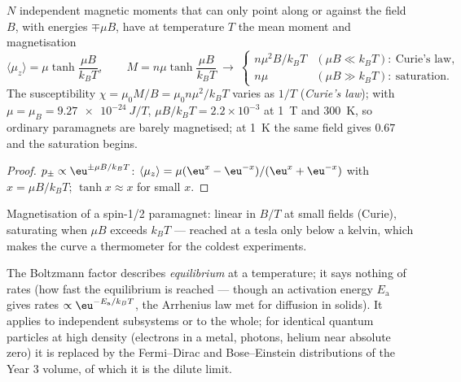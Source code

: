 \begin{proposition}\label{prop:b2:boltzmann-factor:curie}
$N$ independent magnetic moments that can only point along or against
the field $B$, with energies $\mp\mu B$, have at temperature $T$ the mean
moment and magnetisation
\[
\langle\mu_z\rangle = \mu\tanh\frac{\mu B}{k_BT}, \qquad
M = n\mu\tanh\frac{\mu B}{k_BT}
\ \longrightarrow\
\begin{cases} n\mu^2B/k_BT & (\mu B \ll k_BT):\ \text{Curie's law}, \\ n\mu & (\mu B \gg k_BT):\ \text{saturation}. \end{cases}
\]
The susceptibility $\chi = \mu_0M/B = \mu_0n\mu^2/k_BT$ varies as $1/T$
(\emph{Curie's law}\index{Curie's law}); with $\mu = \mu_B = \qty{9.27e-24}{J/T}$,
$\mu B/k_BT = 2.2 \times 10^{-3}$ at \qty{1}{T} and \qty{300}{K}, so ordinary
paramagnets are barely magnetised; at \qty{1}{K} the same field gives
$0.67$ and the saturation begins.
\end{proposition}

\begin{proof}
$p_\pm \propto\eu^{\pm\mu B/k_BT}$: $\langle\mu_z\rangle = \mu(\eu^x - \eu^{-x})/(\eu^x +
\eu^{-x})$ with $x = \mu B/k_BT$; $\tanh x \approx x$ for small $x$.
\end{proof}

\begin{omfigure}

{\small Magnetisation of a spin-1/2 paramagnet: linear in $B/T$ at
small fields (Curie), saturating when $\mu B$ exceeds $k_BT$ --- reached
at a tesla only below a kelvin, which makes the curve a thermometer
for the coldest experiments.}
\end{omfigure}

\begin{remark}\label{rem:b2:boltzmann-factor:limits}
The Boltzmann factor describes \emph{equilibrium} at a temperature; it
says nothing of rates (how fast the equilibrium is reached --- though
an activation energy $E_{\text{a}}$ gives rates $\propto\eu^{-E_{\text{a}}/k_BT}$,
the Arrhenius law met for diffusion in solids). It applies to
independent subsystems or to the whole; for identical quantum
particles at high density (electrons in a metal, photons, helium near
absolute zero) it is replaced by the Fermi--Dirac and Bose--Einstein
distributions of the Year 3 volume, of which it is the dilute limit.
\end{remark}

